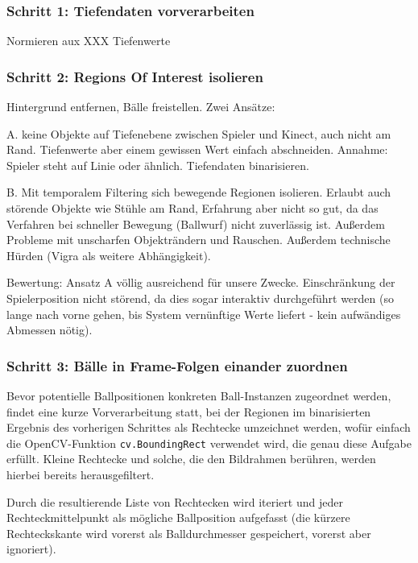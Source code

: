 \documentclass[12pt,a4paper,ngerman]{scrartcl}
\begin{document}
\subsubsection{Schritt 1: Tiefendaten vorverarbeiten}

Normieren aux XXX Tiefenwerte

\subsubsection{Schritt 2: Regions Of Interest isolieren}

Hintergrund entfernen, Bälle freistellen. Zwei Ansätze:

A. keine Objekte auf Tiefenebene zwischen Spieler und Kinect, auch nicht am Rand. Tiefenwerte aber einem gewissen Wert einfach abschneiden. Annahme: Spieler steht auf Linie oder ähnlich. Tiefendaten binarisieren.

B. Mit temporalem Filtering sich bewegende Regionen isolieren. Erlaubt auch störende Objekte wie Stühle am Rand, Erfahrung aber nicht so gut, da das Verfahren bei schneller Bewegung (Ballwurf) nicht zuverlässig ist. Außerdem Probleme mit unscharfen Objekträndern und Rauschen. Außerdem technische Hürden (Vigra als weitere Abhängigkeit).

Bewertung: Ansatz A völlig ausreichend für unsere Zwecke. Einschränkung der Spielerposition nicht störend, da dies sogar interaktiv durchgeführt werden (so lange nach vorne gehen, bis System vernünftige Werte liefert - kein aufwändiges Abmessen nötig).

\subsubsection{Schritt 3: Bälle in Frame-Folgen einander zuordnen}

Bevor potentielle Ballpositionen konkreten Ball-Instanzen zugeordnet werden, findet eine kurze Vorverarbeitung statt, bei der Regionen im binarisierten Ergebnis des vorherigen Schrittes als Rechtecke umzeichnet werden, wofür einfach die OpenCV-Funktion \lstinline{cv.BoundingRect} verwendet wird, die genau diese Aufgabe erfüllt.
Kleine Rechtecke und solche, die den Bildrahmen berühren, werden hierbei bereits herausgefiltert.

Durch die resultierende Liste von Rechtecken wird iteriert und jeder 
Rechteckmittelpunkt als mögliche Ballposition aufgefasst (die kürzere Rechteckskante
wird vorerst als Balldurchmesser gespeichert, vorerst aber ignoriert). 
\end{document}
